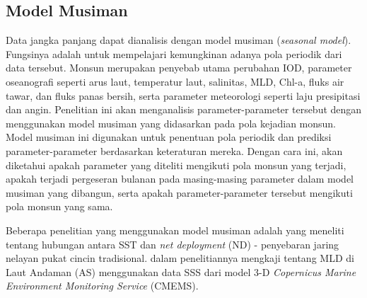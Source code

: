 \begin{spacing}{1.5}
	\subsection[Model Musiman]{Model Musiman}

	Data jangka panjang dapat dianalisis dengan model musiman (\textit{seasonal model}). Fungsinya adalah untuk mempelajari kemungkinan adanya pola periodik dari data tersebut. Monsun merupakan penyebab utama perubahan IOD, parameter oseanografi seperti arus laut, temperatur laut, salinitas, MLD, Chl-a, fluks air tawar, dan fluks panas bersih, serta parameter meteorologi seperti laju presipitasi dan angin. Penelitian ini akan menganalisis parameter-parameter tersebut dengan menggunakan model musiman yang didasarkan pada pola kejadian monsun. Model musiman ini digunakan untuk penentuan pola periodik dan prediksi parameter-parameter berdasarkan keteraturan mereka. Dengan cara ini, akan diketahui apakah parameter yang diteliti mengikuti pola monsun yang terjadi, apakah terjadi pergeseran bulanan pada masing-masing parameter dalam model musiman yang dibangun, serta apakah parameter-parameter tersebut mengikuti pola monsun yang sama.

	Beberapa penelitian yang menggunakan model musiman adalah  \citeyear{Haridhi2016} yang meneliti tentang hubungan antara SST dan \textit{net deployment} (ND) - penyebaran jaring nelayan pukat cincin tradisional.  \citeyear{Ikhwan2022} dalam penelitiannya mengkaji tentang MLD di Laut Andaman (AS) menggunakan data SSS dari model 3-D \textit{Copernicus Marine Environment Monitoring Service} (CMEMS).  
	

\end{spacing}

